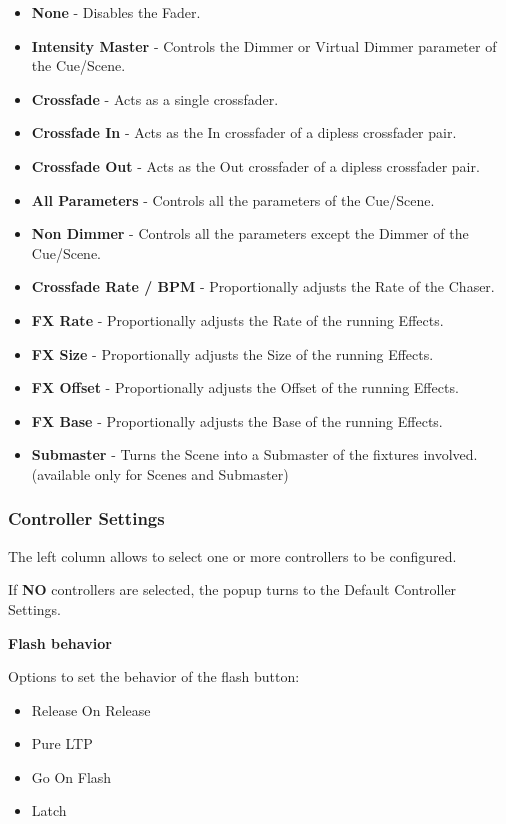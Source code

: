 \documentclass[
]{article}
\begin{document}
\begin{itemize}
\item
  \textbf{None} - Disables the Fader.
\item
  \textbf{Intensity Master} - Controls the Dimmer or Virtual Dimmer parameter of the Cue/Scene.
\item
  \textbf{Crossfade} - Acts as a single crossfader.
\item
  \textbf{Crossfade In} - Acts as the In crossfader of a dipless crossfader pair.
\item
  \textbf{Crossfade Out} - Acts as the Out crossfader of a dipless crossfader pair.
\item
  \textbf{All Parameters} - Controls all the parameters of the Cue/Scene.
\item
  \textbf{Non Dimmer} - Controls all the parameters except the Dimmer of the Cue/Scene.
\item
  \textbf{Crossfade Rate / BPM} - Proportionally adjusts the Rate of the Chaser.
\item
  \textbf{FX Rate} - Proportionally adjusts the Rate of the running Effects.
\item
  \textbf{FX Size} - Proportionally adjusts the Size of the running Effects.
\item
  \textbf{FX Offset} - Proportionally adjusts the Offset of the running Effects.
\item
  \textbf{FX Base} - Proportionally adjusts the Base of the running Effects.
\item
  \textbf{Submaster} - Turns the Scene into a Submaster of the fixtures involved. (available only for Scenes and Submaster)
\end{itemize}

\hypertarget{controller-settings-1}{%
\subsubsection{Controller Settings}\label{controller-settings-1}}

The left column allows to select one or more controllers to be configured.

If \textbf{NO} controllers are selected, the popup turns to the Default Controller Settings.

\textbf{Flash behavior}

Options to set the behavior of the flash button:

\begin{itemize}
\item
  Release On Release
\item
  Pure LTP
\item
  Go On Flash
\item
  Latch
\end{itemize}
\end{document}
